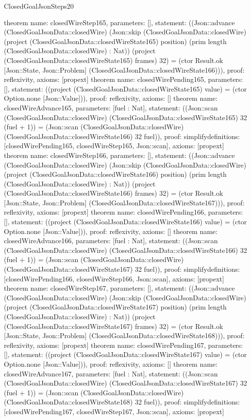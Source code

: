 \begin{lexlean}{ClosedGoalJsonSteps20}
\begin{semanticmodule}
{}
theorem{
 name: closedWireStep165, parameters: [],
 statement: ((Json::advance (ClosedGoalJsonData::closedWire) (Json::skip (ClosedGoalJsonData::closedWire) (project (ClosedGoalJsonData::closedWireState165) position) (prim length (ClosedGoalJsonData::closedWire) : Nat)) (project (ClosedGoalJsonData::closedWireState165) frames) 32) = (ctor Result.ok [Json::State, Json::Problem] (ClosedGoalJsonData::closedWireState166))), proof: reflexivity{}, axioms: [propext]
}
theorem{
 name: closedWirePending165, parameters: [],
 statement: ((project (ClosedGoalJsonData::closedWireState165) value) = (ctor Option.none [Json::Value])), proof: reflexivity{}, axioms: []
}
theorem{
 name: closedWireAdvance165, parameters: [fuel : Nat],
 statement: ((Json::scan (ClosedGoalJsonData::closedWire) (ClosedGoalJsonData::closedWireState165) 32 (fuel + 1)) = (Json::scan (ClosedGoalJsonData::closedWire) (ClosedGoalJsonData::closedWireState166) 32 fuel)), proof: simplify{definitions: [closedWirePending165, closedWireStep165, Json::scan]}, axioms: [propext]
}
theorem{
 name: closedWireStep166, parameters: [],
 statement: ((Json::advance (ClosedGoalJsonData::closedWire) (Json::skip (ClosedGoalJsonData::closedWire) (project (ClosedGoalJsonData::closedWireState166) position) (prim length (ClosedGoalJsonData::closedWire) : Nat)) (project (ClosedGoalJsonData::closedWireState166) frames) 32) = (ctor Result.ok [Json::State, Json::Problem] (ClosedGoalJsonData::closedWireState167))), proof: reflexivity{}, axioms: [propext]
}
theorem{
 name: closedWirePending166, parameters: [],
 statement: ((project (ClosedGoalJsonData::closedWireState166) value) = (ctor Option.none [Json::Value])), proof: reflexivity{}, axioms: []
}
theorem{
 name: closedWireAdvance166, parameters: [fuel : Nat],
 statement: ((Json::scan (ClosedGoalJsonData::closedWire) (ClosedGoalJsonData::closedWireState166) 32 (fuel + 1)) = (Json::scan (ClosedGoalJsonData::closedWire) (ClosedGoalJsonData::closedWireState167) 32 fuel)), proof: simplify{definitions: [closedWirePending166, closedWireStep166, Json::scan]}, axioms: [propext]
}
theorem{
 name: closedWireStep167, parameters: [],
 statement: ((Json::advance (ClosedGoalJsonData::closedWire) (Json::skip (ClosedGoalJsonData::closedWire) (project (ClosedGoalJsonData::closedWireState167) position) (prim length (ClosedGoalJsonData::closedWire) : Nat)) (project (ClosedGoalJsonData::closedWireState167) frames) 32) = (ctor Result.ok [Json::State, Json::Problem] (ClosedGoalJsonData::closedWireState168))), proof: reflexivity{}, axioms: [propext]
}
theorem{
 name: closedWirePending167, parameters: [],
 statement: ((project (ClosedGoalJsonData::closedWireState167) value) = (ctor Option.none [Json::Value])), proof: reflexivity{}, axioms: []
}
theorem{
 name: closedWireAdvance167, parameters: [fuel : Nat],
 statement: ((Json::scan (ClosedGoalJsonData::closedWire) (ClosedGoalJsonData::closedWireState167) 32 (fuel + 1)) = (Json::scan (ClosedGoalJsonData::closedWire) (ClosedGoalJsonData::closedWireState168) 32 fuel)), proof: simplify{definitions: [closedWirePending167, closedWireStep167, Json::scan]}, axioms: [propext]
}
\end{semanticmodule}
\end{lexlean}
